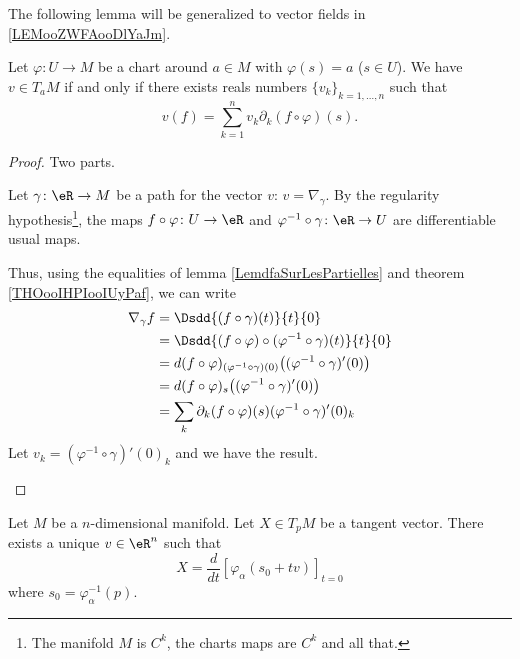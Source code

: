 The following lemma will be generalized to vector fields in \ref{LEMooZWFAooDlYaJm}.
\begin{lemma}       \label{LEMooSCVHooYPiGse}
	Let \( \varphi\colon U\to M\) be a chart around \( a\in M\) with \( \varphi(s)=a\) (\( s\in U\)). We have \( v\in T_aM\) if and only if there exists reals numbers \( \{ v_k \}_{k=1,\ldots, n}\) such that
	\begin{equation}        \label{EQooNEDSooOhyrCZ}
		v(f)=\sum_{k=1}^nv_k\partial_k(f\circ \varphi)(s).
	\end{equation}
\end{lemma}

\begin{proof}
	Two parts.
	\begin{subproof}
		\spitem[\( \Rightarrow\)]
		Let \( \gamma\colon \eR\to M\) be a path for the vector \( v\): \( v=\nabla_{\gamma}\). By the regularity hypothesis\footnote{The manifold \( M\) is \( C^k\), the charts maps are \( C^k\) and all that.}, the maps \( f\circ \varphi\colon U\to \eR\) and \( \varphi^{-1}\circ\gamma\colon \eR \to U \) are differentiable usual maps.

		Thus, using the equalities of lemma \ref{LemdfaSurLesPartielles} and theorem \ref{THOooIHPIooIUyPaf}, we can write
		\begin{subequations}
			\begin{align}
				\nabla_{\gamma}f & =\Dsdd{ (f\circ\gamma)(t) }{t}{0}                                                          \\
				                 & =\Dsdd{ (f\circ\varphi)\circ(\varphi^{-1}\circ\gamma)(t) }{t}{0}                           \\
				                 & =d(f\circ \varphi)_{(\varphi^{-1}\circ\gamma)(0)}\big( (\varphi^{-1}\circ\gamma)'(0) \big) \\
				                 & =d(f\circ \varphi)_{s}\big( (\varphi^{-1}\circ\gamma)'(0) \big)                            \\
				                 & =\sum_k\partial_k(f\circ \varphi)(s)(\varphi^{-1}\circ\gamma)'(0)_k
			\end{align}
		\end{subequations}
		Let \( v_k=(\varphi^{-1}\circ\gamma)'(0)_k\) and we have the result.
		\spitem[$ \Leftarrow$ ]
	\end{subproof}
\end{proof}


\begin{proposition}		\label{PROPooLHMSooMMXrSS}
	Let \( M\) be a \( n\)-dimensional manifold. Let \( X\in T_pM\) be a tangent vector. There exists a unique \( v\in \eR^n\) such that
	\begin{equation}
		X=\frac{d}{dt} \left[ \varphi_{\alpha}(s_0+tv)  \right]_{t=0}
	\end{equation}
	where \( s_0=\varphi_{\alpha}^{-1}(p)\).
\end{proposition}

